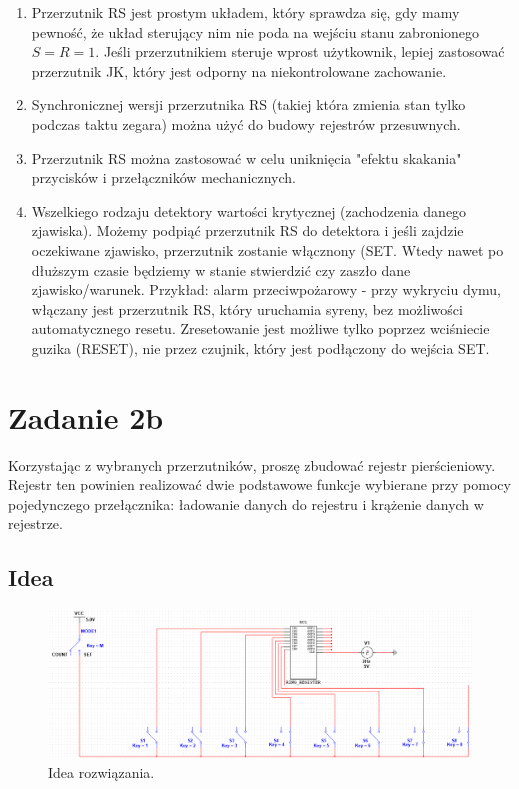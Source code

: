 \documentclass[12pt,a4paper,openright]{mwrep}
\begin{document}
\begin{enumerate}
    \item Przerzutnik RS jest prostym układem, który sprawdza się,
        gdy mamy pewność, że układ sterujący nim nie poda na wejściu stanu zabronionego $S = R = 1$. Jeśli przerzutnikiem
        steruje wprost użytkownik, lepiej zastosować przerzutnik JK, który jest odporny na niekontrolowane zachowanie.

    \item Synchronicznej wersji przerzutnika RS (takiej która zmienia stan 
    tylko podczas taktu zegara) można użyć do budowy rejestrów przesuwnych.
    
    \item Przerzutnik RS można zastosować w celu uniknięcia 
    "efektu skakania" przycisków i przełączników mechanicznych.

    \item Wszelkiego rodzaju detektory wartości krytycznej (zachodzenia danego zjawiska).
    Możemy podpiąć przerzutnik RS do detektora i jeśli zajdzie oczekiwane zjawisko,
    przerzutnik zostanie włącznony (SET. Wtedy nawet po dłuższym czasie będziemy
    w stanie stwierdzić czy zaszło dane zjawisko/warunek.
    Przykład: alarm przeciwpożarowy - przy wykryciu dymu, włączany jest 
    przerzutnik RS, który uruchamia syreny, bez możliwości automatycznego resetu.
    Zresetowanie jest możliwe tylko poprzez wciśniecie guzika (RESET), nie przez czujnik,
    który jest podłączony do wejścia SET.
\end{enumerate}

\chapter{Zadanie 2b}
Korzystając z wybranych przerzutników, proszę zbudować rejestr 
pierścieniowy. Rejestr ten powinien realizować dwie podstawowe 
funkcje wybierane przy pomocy 
pojedynczego przełącznika: ładowanie danych do rejestru i krążenie danych w rejestrze.

\section{Idea}

\begin{figure}[H]
    \centering
    \includegraphics[width=0.8\linewidth]{images/2b_idea.png}
    \caption{Idea rozwiązania.}
    \label{fig:2b_idea}
\end{figure}
\end{document}
